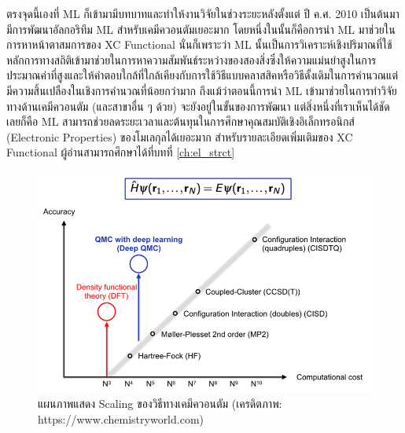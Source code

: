 ตรงจุดนี้เองที่ ML ก็เข้ามามีบทบาทและทำให้งานวิจัยในช่วงระยะหลังตั้งแต่ ปี ค.ศ. 2010 เป็นต้นมามีการพัฒนาอัลกอริทึม ML สำหรับเคมีควอนตัมเยอะมาก โดยหนึ่งในนั้นก็คือการนำ ML มาช่วยในการหาหน้าตาสมการของ XC Functional นั่นก็เพราะว่า ML นั้นเป็นการวิเคราะห์เชิงปริมาณที่ใช้หลักการทางสถิติเข้ามาช่วยในการหาความสัมพันธ์ระหว่างของสองสิ่งซึ่งให้ความแม่นยำสูงในการประมาณค่าที่สูงและให้คำตอบใกล้ที่ใกล้เคียงกับการใช้วิธีแบบคลาสสิคหรือวิธีดั้งเดิมในการคำนวณแต่มีความสิ้นเปลืองในเชิงการคำนวณที่น้อยกว่ามาก ถึงแม้ว่าตอนนี้การนำ ML เข้ามาช่วยในการทำวิจัยทางด้านเคมีควอนตัม (และสาขาอื่น ๆ ด้วย) จะยังอยู่ในขั้นของการพัฒนา แต่สิ่งหนึ่งที่เราเห็นได้ชัดเลยก็คือ ML สามารถช่วยลดระยะเวลาและต้นทุนในการศึกษาคุณสมบัติเชิงอิเล็กทรอนิกส์ (Electronic Properties) ของโมเลกุลได้เยอะมาก สำหรับรายละเอียดเพิ่มเติมของ XC Functional ผู้อ่านสามารถศึกษาได้ที่บทที่ \ref{ch:el_strct}

\begin{figure}[H]
    \centering
    \includegraphics[width=0.8\linewidth]{fig/qm_scaling.png}
    \caption{แผนภาพแสดง Scaling ของวิธีทางเคมีควอนตัม (เครดิตภาพ: https://www.chemistryworld.com)}
    \label{fig:qm_scaling}
\end{figure}

